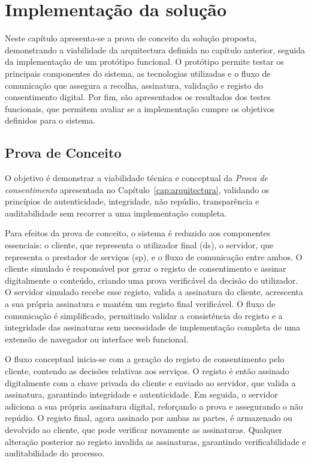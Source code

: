 \chapter{Implementação da solução}
\label{cap:implementacao}

Neste capítulo apresenta-se a prova de conceito da solução proposta, demonstrando a viabilidade da arquitectura definida no capítulo anterior, seguida da implementação de um protótipo funcional. O protótipo permite testar os principais componentes do sistema, as tecnologias utilizadas e o fluxo de comunicação que assegura a recolha, assinatura, validação e registo do consentimento digital. Por fim, são apresentados os resultados dos testes funcionais, que permitem avaliar se a implementação cumpre os objetivos definidos para o sistema.

\section{Prova de Conceito}

O objetivo é demonstrar a viabilidade técnica e conceptual da \textit{Prova de consentimento} apresentada no Capítulo~\ref{cap:arquitectura}, validando os princípios de autenticidade, integridade, não repúdio, transparência e auditabilidade sem recorrer a uma implementação completa.

Para efeitos da prova de conceito, o sistema é reduzido aos componentes essenciais: o cliente, que representa o utilizador final (\acrshort{ds}), o servidor, que representa o prestador de serviços (\acrshort{sp}), e o fluxo de comunicação entre ambos. O cliente simulado é responsável por gerar o registo de consentimento e assinar digitalmente o conteúdo, criando uma prova verificável da decisão do utilizador. O servidor simulado recebe esse registo, valida a assinatura do cliente, acrescenta a sua própria assinatura e mantém um registo final verificável. O fluxo de comunicação é simplificado, permitindo validar a consistência do registo e a integridade das assinaturas sem necessidade de implementação completa de uma extensão de navegador ou interface web funcional.

O fluxo conceptual inicia-se com a geração do registo de consentimento pelo cliente, contendo as decisões relativas aos serviços. O registo é então assinado digitalmente com a chave privada do cliente e enviado ao servidor, que valida a assinatura, garantindo integridade e autenticidade. Em seguida, o servidor adiciona a sua própria assinatura digital, reforçando a prova e assegurando o não repúdio. O registo final, agora assinado por ambas as partes, é armazenado ou devolvido ao cliente, que pode verificar novamente as assinaturas. Qualquer alteração posterior no registo invalida as assinaturas, garantindo verificabilidade e auditabilidade do processo.

